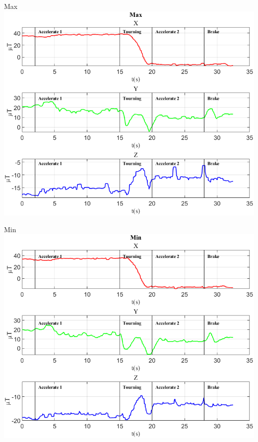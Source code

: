 \documentclass[beamer]{standalone}
\begin{document}
	
	\begin{frame}{{Max}}
		\centering\includegraphics[height=.8\textheight]{figure/Mag/Max}
	\end{frame}
	
	\begin{frame}{{Min}}
		\centering\includegraphics[height=.8\textheight]{figure/Mag/Min}
	\end{frame}
	
\end{document}

